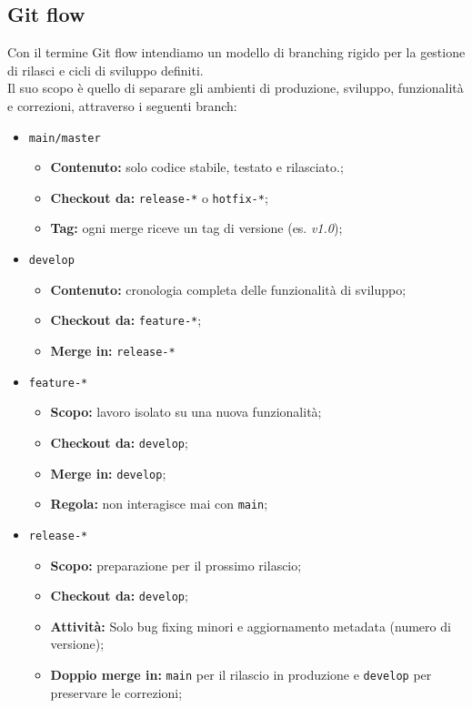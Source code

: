 \documentclass[12pt]{article}
\begin{document}
\begin{samepage}
\subsection{Git flow}
Con il termine Git flow intendiamo un modello di branching rigido per la gestione di rilasci e cicli di sviluppo definiti.\\
Il suo scopo è quello di separare gli ambienti di produzione, sviluppo, funzionalità e correzioni, attraverso i seguenti branch:
\begin{itemize}
\item \texttt{main/master}
\begin{itemize}
\item \textbf{Contenuto:} solo codice stabile, testato e rilasciato.;
\item \textbf{Checkout da:} \texttt{release-*} o \texttt{hotfix-*};
\item \textbf{Tag:} ogni merge riceve un tag di versione (es. \textit{v1.0});
\end{itemize}
\item \texttt{develop}
\begin{itemize}
\item \textbf{Contenuto:} cronologia completa delle funzionalità di sviluppo;
\item \textbf{Checkout da:} \texttt{feature-*};
\item \textbf{Merge in:} \texttt{release-*}
\end{itemize}
\item \texttt{feature-*}
\begin{itemize}
\item \textbf{Scopo:} lavoro isolato su una nuova funzionalità;
\item \textbf{Checkout da:} \texttt{develop};
\item \textbf{Merge in:} \texttt{develop};
\item \textbf{Regola:} non interagisce mai con \texttt{main};
\end{itemize}
\item \texttt{release-*}
\begin{itemize}
\item \textbf{Scopo:} preparazione per il prossimo rilascio;
\item \textbf{Checkout da:} \texttt{develop};
\item \textbf{Attività:} Solo bug fixing minori e aggiornamento metadata (numero di versione);
\item \textbf{Doppio merge in:} \texttt{main} per il rilascio in produzione e \texttt{develop} per preservare le correzioni;

\end{itemize}
\end{itemize}
\end{samepage}
\end{document}
